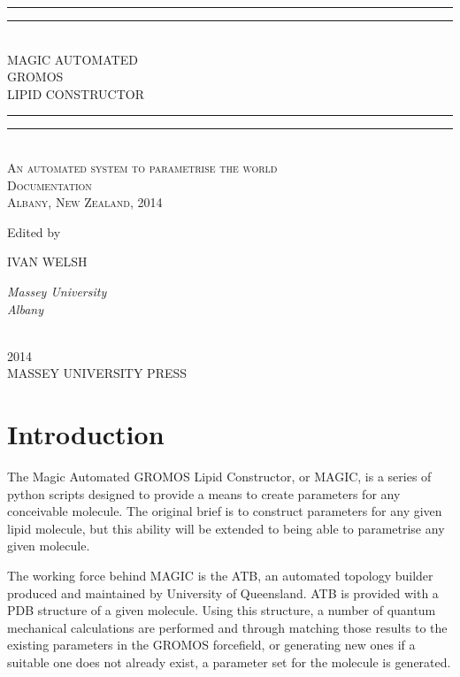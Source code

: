 \documentclass[a4paper,11pt,oneside,openright]{book}
\newcommand*{\plogo}{\fbox{$\mathcal{MUP}$}} %
\newcommand*{\titleGP}{\begingroup %
\centering %
\vspace*{\baselineskip} %

\rule{\textwidth}{1.6pt}\vspace*{-\baselineskip}\vspace*{2pt} %
\rule{\textwidth}{0.4pt}\\[\baselineskip] %

{\LARGE MAGIC AUTOMATED\\ GROMOS \\[0.3\baselineskip] LIPID CONSTRUCTOR}\\[0.2\baselineskip] %

\rule{\textwidth}{0.4pt}\vspace*{-\baselineskip}\vspace{3.2pt} %
\rule{\textwidth}{1.6pt}\\[\baselineskip] %

\scshape %
An automated system to parametrise the world\\ %
Documentation \\[\baselineskip] %
Albany, New Zealand,  2014\par %

\vspace*{2\baselineskip} %

Edited by \\[\baselineskip]
{\Large IVAN WELSH \par} %
{\itshape Massey University \\ Albany\par} %

\vfill %

\plogo \\[0.3\baselineskip] %
{\scshape 2014} \\[0.3\baselineskip] %
{\large MASSEY UNIVERSITY PRESS}\par %

\endgroup}
\begin{document}
 
\frontmatter
\pagestyle{empty} %
\titleGP %
\newpage
\pagestyle{plain}
\tableofcontents
\mainmatter
\chapter{Introduction}\label{ch:introduction}
The Magic Automated GROMOS Lipid Constructor, or MAGIC, is a series of python scripts designed to provide a means to create parameters for any conceivable molecule. The original brief is to construct parameters for any given lipid molecule, but this ability will be extended to being able to parametrise any given molecule.
\par{The working force behind MAGIC is the ATB, an automated topology builder produced and maintained by University of Queensland. ATB is provided with a PDB structure of a given molecule. Using this structure, a number of quantum mechanical calculations are performed and through matching those results to the existing parameters in the GROMOS forcefield, or generating new ones if a suitable one does not already exist, a parameter set for the molecule is generated.}
\end{document}
